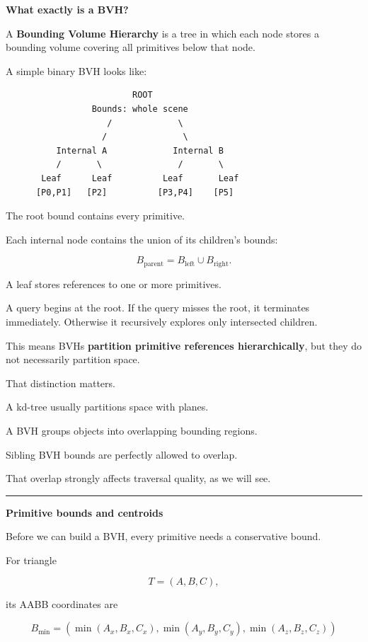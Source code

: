 \textbf{What exactly is a BVH?}

A \textbf{Bounding Volume Hierarchy} is a tree in which each node stores a bounding volume covering all primitives below that node.

A simple binary BVH looks like:

\begin{verbatim}
                         ROOT
                 Bounds: whole scene
                    /             \
                   /               \
          Internal A             Internal B
          /       \               /       \
       Leaf      Leaf          Leaf       Leaf
      [P0,P1]   [P2]          [P3,P4]    [P5]
\end{verbatim}

The root bound contains every primitive.

Each internal node contains the union of its children's bounds:

\[
B_{\text{parent}}
=
B_{\text{left}}\cup B_{\text{right}}.
\]

A leaf stores references to one or more primitives.

A query begins at the root. If the query misses the root, it terminates immediately. Otherwise it recursively explores only intersected children.

This means BVHs \textbf{partition primitive references hierarchically}, but they do not necessarily partition space.

That distinction matters.

A kd-tree usually partitions space with planes.

A BVH groups objects into overlapping bounding regions.

Sibling BVH bounds are perfectly allowed to overlap.

That overlap strongly affects traversal quality, as we will see.

\begin{center}\rule{0.5\linewidth}{0.5pt}\end{center}

\textbf{Primitive bounds and centroids}

Before we can build a BVH, every primitive needs a conservative bound.

For triangle

\[
T=(A,B,C),
\]

its AABB coordinates are

\[
B_{\min}=
\left(
\min(A_x,B_x,C_x),
\min(A_y,B_y,C_y),
\min(A_z,B_z,C_z)
\right)
\]


